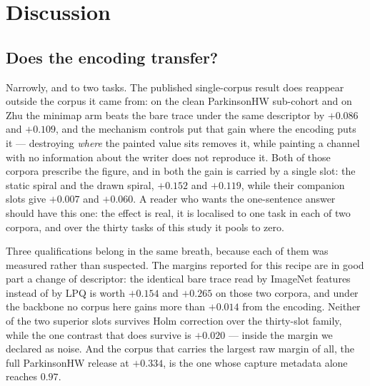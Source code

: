 
\section{Discussion}
\label{sec:discussion}

\subsection{Does the encoding transfer?}
\label{sec:discussion-transfer}

Narrowly, and to two tasks. The published single-corpus result does reappear outside the corpus it
came from: on the clean ParkinsonHW sub-cohort and on Zhu the minimap arm beats the bare trace
under the same descriptor by $+0.086$ and $+0.109$, and the mechanism controls put that gain where
the encoding puts it --- destroying \emph{where} the painted value sits removes it, while painting a
channel with no information about the writer does not reproduce it. Both of those corpora prescribe
the figure, and in both the gain is carried by a single slot: the static spiral and the drawn
spiral, $+0.152$ and $+0.119$, while their companion slots give $+0.007$ and $+0.060$. A reader who
wants the one-sentence answer should have this one: the effect is real, it is localised to one task
in each of two corpora, and over the thirty tasks of this study it pools to zero.

Three qualifications belong in the same breath, because each of them was measured rather than
suspected. The margins reported for this recipe are in good part a change of descriptor: the
identical bare trace read by ImageNet features instead of by LPQ is worth $+0.154$ and $+0.265$ on
those two corpora, and under the backbone no corpus here gains more than $+0.014$ from the encoding.
Neither of the two superior slots survives Holm correction over the thirty-slot family, while the
one contrast that does survive is $+0.020$ --- inside the margin we declared as noise. And the
corpus that carries the largest raw margin of all, the full ParkinsonHW release at $+0.334$, is the
one whose capture metadata alone reaches $0.97$.

